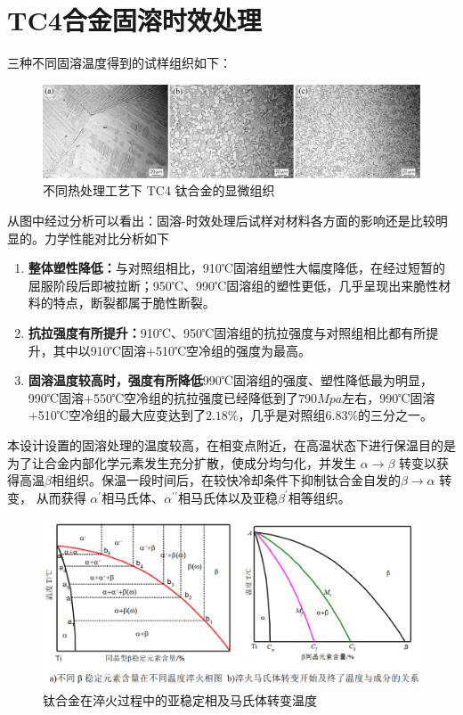 \chapter{TC4合金固溶时效处理}
三种不同固溶温度得到的试样组织如下：
\begin{figure}[h!]
	\centering
	\includegraphics[width=0.7\linewidth]{pic/demo-mico}
	\caption{不同热处理工艺下 TC4 钛合金的显微组织}
	\label{fig:demo-mico}
\end{figure}

从图中经过分析可以看出：固溶-时效处理后试样对材料各方面的影响还是比较明显的。力学性能对比分析如下
\begin{enumerate}
	\item \textbf{整体塑性降低：}与对照组相比，910℃固溶组塑性大幅度降低，在经过短暂的屈服阶段后即被拉断；950℃、990℃固溶组的塑性更低，几乎呈现出来脆性材料的特点，断裂都属于脆性断裂。
	\item \textbf{抗拉强度有所提升：}910℃、950℃固溶组的抗拉强度与对照组相比都有所提升，其中以910℃固溶+510℃空冷组的强度为最高。
	\item \textbf{固溶温度较高时，强度有所降低}990℃固溶组的强度、塑性降低最为明显，990℃固溶+550℃空冷组的抗拉强度已经降低到了$ 790Mpa $左右，990℃固溶+510℃空冷组的最大应变达到了$ 2.18\% $，几乎是对照组$ 6.83\% $的三分之一。
\end{enumerate}


本设计设置的固溶处理的温度较高，在相变点附近，在高温状态下进行保温目的是为了让合金内部化学元素发生充分扩散，使成分均匀化，并发生 $\alpha\to\beta$ 转变以获得高温$ \beta $相组织。保温一段时间后，在较快冷却条件下抑制钛合金自发的$\beta\to \alpha$ 转变， 从而获得 $ \alpha^{\prime} $相马氏体、$ \alpha^{\prime\prime} $相马氏体以及亚稳$ \beta^{\prime} $相等组织。

\begin{figure}[h!]
	\centering
	\includegraphics[width=0.7\linewidth]{pic/tc4change}
	\caption{钛合金在淬火过程中的亚稳定相及马氏体转变温度}
	\label{fig:tc4change}
\end{figure}

